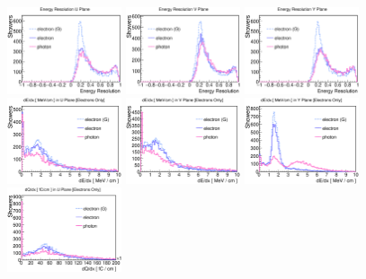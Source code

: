 \begin{figure}[htbp]
\begin{center}
\includegraphics[width=0.3\textwidth]{figs/mc/single_em/EnergyResU.eps}
\includegraphics[width=0.3\textwidth]{figs/mc/single_em/EnergyResV.eps}
\includegraphics[width=0.3\textwidth]{figs/mc/single_em/EnergyResY.eps}
\includegraphics[width=0.3\textwidth]{figs/mc/single_em/dEdxU.eps}
\includegraphics[width=0.3\textwidth]{figs/mc/single_em/dEdxV.eps}
\includegraphics[width=0.3\textwidth]{figs/mc/single_em/dEdxY.eps}
\includegraphics[width=0.3\textwidth]{figs/mc/single_em/dQdxU.eps}

\end{center}
\end{figure}
